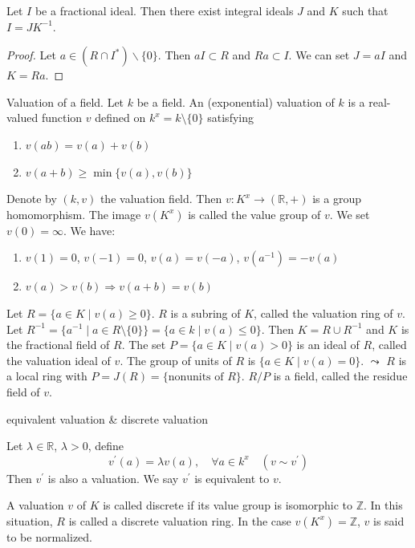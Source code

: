 \documentclass[11pt, a4paper]{report}
\begin{document}
\begin{proposition}
Let $I$ be a fractional ideal. Then there exist integral ideals $J$ and $K$ such that $I = J K^{-1}$.
\end{proposition}

\begin{proof}
Let $a \in (R \cap I^{*}) \backslash \{0\}$. Then $a I \subset R$ and $Ra \subset I$. We can set $J = a I$ and $K = Ra$.
\end{proof}

\begin{definition}
Valuation of a field.
Let $k$ be a field. An (exponential) valuation of $k$ is a real-valued function $v$ defined on $k^{x}=k \setminus \{0\}$ satisfying
\begin{enumerate}
\item $v(ab)=v(a)+v(b)$
\item $v(a+b) \geqslant \min \{v(a), v(b)\}$
\end{enumerate}
Denote by $(k, v)$ the valuation field.
Then $v\colon K^{x} \rightarrow (\mathbb{R}, +)$ is a group homomorphism.
The image $v(K^{x})$ is called the value group of $v$.
We set $v(0)=\infty$.
We have:
\begin{enumerate}
\item $v(1)=0$, $v(-1)=0$, $v(a)=v(-a)$, $v\left(a^{-1}\right)=-v(a)$
\item $v(a)>v(b) \Rightarrow v(a+b)=v(b)$
\end{enumerate}
Let $R=\{a \in K \mid v(a) \geqslant 0\}$. $R$ is a subring of $K$, called the valuation ring of $v$.
Let $R^{-1}=\{a^{-1} \mid a \in R \setminus \{0\}\}=\{a \in k \mid v(a) \leqslant 0\}$.
Then $K=R \cup R^{-1}$ and $K$ is the fractional field of $R$.
The set $P=\{a \in K \mid v(a)>0\}$ is an ideal of $R$, called the valuation ideal of $v$.
The group of units of $R$ is $\{a \in K \mid v(a)=0\}$.
$\leadsto$ $R$ is a local ring with $P=J(R)=\{\text{nonunits of } R\}$.
$R / P$ is a field, called the residue field of $v$.

\end{definition}

\begin{definition}
equivalent valuation \& discrete valuation

Let $\lambda \in \mathbb{R}$, $\lambda>0$, define
\[
v^{\prime}(a)=\lambda v(a), \quad \forall a \in k^{x} \quad (v \sim v^{\prime})
\]
Then $v^{\prime}$ is also a valuation. We say $v^{\prime}$ is equivalent to $v$.

A valuation $v$ of $K$ is called discrete if its value group is isomorphic to $\mathbb{Z}$. In this situation, $R$ is called a discrete valuation ring. In the case $v\left(K^{x}\right)=\mathbb{Z}$, $v$ is said to be normalized.

\end{definition}
\end{document}
